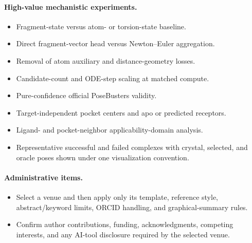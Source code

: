 \paragraph{High-value mechanistic experiments.}
\begin{itemize}
    \item Fragment-state versus atom- or torsion-state baseline.
    \item Direct fragment-vector head versus Newton--Euler aggregation.
    \item Removal of atom auxiliary and distance-geometry losses.
    \item Candidate-count and ODE-step scaling at matched compute.
    \item Pure-confidence official PoseBusters validity.
    \item Target-independent pocket centers and apo or predicted receptors.
    \item Ligand- and pocket-neighbor applicability-domain analysis.
    \item Representative successful and failed complexes with crystal,
    selected, and oracle poses shown under one visualization convention.
\end{itemize}

\paragraph{Administrative items.}
\begin{itemize}
    \item Select a venue and then apply only its template, reference style,
    abstract/keyword limits, ORCID handling, and graphical-summary rules.
    \item Confirm author contributions, funding, acknowledgments, competing
    interests, and any AI-tool disclosure required by the selected venue.
\end{itemize}

